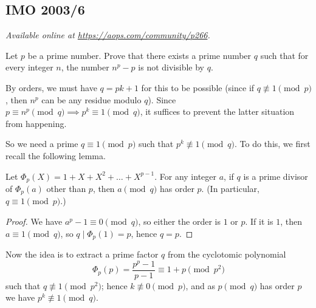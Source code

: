 \documentclass[11pt]{scrartcl}
\begin{document}
\subsection{IMO 2003/6}
\textsl{Available online at \url{https://aops.com/community/p266}.}
\begin{mdframed}[style=mdpurplebox,frametitle={Problem statement}]
Let $p$ be a prime number.
Prove that there exists a prime number $q$
such that for every integer $n$,
the number $n^p-p$ is not divisible by $q$.
\end{mdframed}
By orders, we must have $q=pk+1$ for this to be possible
(since if $q \not \equiv 1 \pmod p$, then $n^p$ can be any residue modulo $q$).
Since $p \equiv n^p \pmod q \implies p^k \equiv 1 \pmod q$,
it suffices to prevent the latter situation from happening.

So we need a prime $q \equiv 1 \pmod p$ such that $p^k \not\equiv 1 \pmod q$.
To do this, we first recall the following lemma.
\begin{lemma*}
  Let $\Phi_p(X) = 1 + X + X^2 + \dots + X^{p-1}$.
  For any integer $a$, if $q$ is a prime divisor of $\Phi_p(a)$ other than $p$,
  then $a \pmod q$ has order $p$. (In particular, $q \equiv 1 \pmod p$.)
\end{lemma*}
\begin{proof}
  We have $a^p-1 \equiv 0 \pmod q$, so either the order is $1$ or $p$.
  If it is $1$, then $a \equiv 1 \pmod q$, so $q \mid \Phi_p(1) = p$, hence $q = p$.
\end{proof}

Now the idea is to extract a prime factor $q$
from the cyclotomic polynomial
\[ \Phi_p(p) = \frac{p^p-1}{p-1} \equiv 1+p \pmod{p^2} \]
such that $q \not\equiv 1 \pmod{p^2}$;
hence $k \not\equiv 0 \pmod p$,
and as $p \pmod q$ has order $p$ we have $p^k \not\equiv 1 \pmod q$.
\pagebreak
\end{document}
